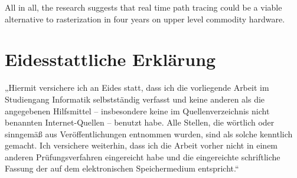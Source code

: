 \documentclass[
  twoside,
  11pt, a4paper,
  footinclude=true,
  headinclude=true,
  cleardoublepage=empty
]{scrreprt}
\begin{document}
All in all, the research suggests that real time path tracing could be a viable alternative to
rasterization in four years on upper level commodity hardware.
\listoffigures
\listoflistings
\listoftables



\chapter*{Eidesstattliche Erklärung}
\onehalfspace
„Hiermit versichere ich an Eides statt, dass ich die vorliegende Arbeit im
Studiengang Informatik selbstständig verfasst und keine anderen als die
angegebenen Hilfsmittel – insbesondere keine im Quellenverzeichnis nicht
benannten Internet-Quellen – benutzt habe. Alle Stellen, die wörtlich oder
sinngemäß aus Veröffentlichungen entnommen wurden, sind als solche kenntlich
gemacht. Ich versichere weiterhin, dass ich die Arbeit vorher nicht in einem
anderen Prüfungsverfahren eingereicht habe und die eingereichte schriftliche
Fassung der auf dem elektronischen Speichermedium entspricht.“
\singlespace
\end{document}
